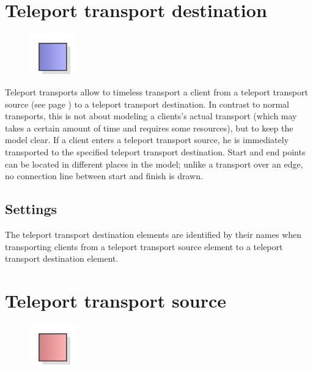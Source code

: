 \section{Teleport transport destination}
\label{ref:ModelElementTeleportDestination}

\begin{figure}
\vspace{-22pt}
\includegraphics[width=2cm]{imageModelElementTeleportDestination.png}
\vspace{-22pt}
\end{figure}

Teleport transports allow to timeless transport a client from a 
teleport transport source (see page \pageref{ref:ModelElementTeleportSource}) 
to a teleport transport destination.
In contrast to normal transports, this is not about modeling a clients's actual transport
(which may takes a certain amount of time and requires some resources), but to keep the model clear.
If a client enters a teleport transport source, he is immediately transported to the specified
teleport transport destination. Start and end points can be located in different places in the model;
unlike a transport over an edge, no connection line between start and finish is drawn.

\subsection*{Settings}

The teleport transport destination elements are identified by their names when transporting
clients from a teleport transport source element to a teleport transport destination element.


\section{Teleport transport source}
\label{ref:ModelElementTeleportSource}

\begin{figure}
\vspace{-22pt}
\includegraphics[width=2cm]{imageModelElementTeleportSource.png}
\vspace{-22pt}
\end{figure}

